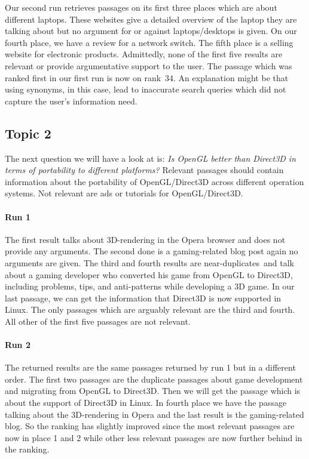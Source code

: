 Our second run retrieves passages on its first three places which are about different laptops.
These websites give a detailed overview of the laptop they are talking about but no argument for or against laptops/desktops is given.
On our fourth place, we have a review for a network switch.
The fifth place is a selling website for electronic products.
Admittedly, none of the first five results are relevant or provide argumentative support to the user.
The passage which was ranked first in our first run is now on rank~34.
An explanation might be that using synonyms, in this case, lead to inaccurate search queries which did not capture the user's information need.

\subsection{Topic 2}

The next question we will have a look at is:
\textit{Is OpenGL better than Direct3D in terms of portability to different platforms?}
Relevant passages should contain information about the portability of OpenGL/Direct3D across different operation systems.
Not relevant are ads or tutorials for OpenGL/Direct3D.

\paragraph{Run 1}

The first result talks about 3D-rendering in the Opera browser and does not provide any arguments.
The second done is a gaming-related blog post again no arguments are given.
The third and fourth results are near-duplicates~\todocite and talk about a gaming developer who converted his game from OpenGL to Direct3D, including problems, tips, and anti-patterns while developing a 3D game.
In our last passage, we can get the information that Direct3D is now supported in Linux.
The only passages which are arguably relevant are the third and fourth.
All other of the first five passages are not relevant.

\paragraph{Run 2}

The returned results are the same passages returned by run 1 but in a different order.
The first two passages are the duplicate passages about game development and migrating from OpenGL to Direct3D.
Then we will get the passage which is about the support of Direct3D in Linux.
In fourth place we have the passage talking about the 3D-rendering in Opera and the last result is the gaming-related blog.
So the ranking has slightly improved since the most relevant passages are now in place 1 and 2 while other less relevant passages are now further behind in the ranking.

